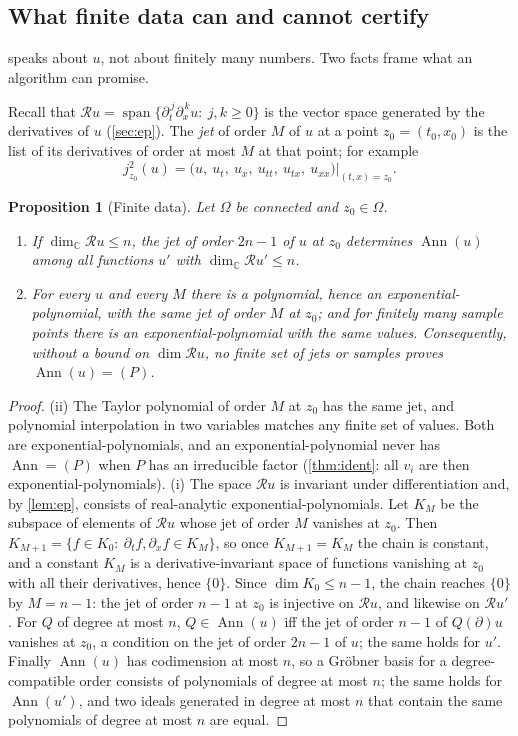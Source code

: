 \documentclass[11pt]{article}
\theoremstyle{plain}
\newtheorem{proposition}[theorem]{Proposition}
\theoremstyle{definition}
\theoremstyle{remark}
\newcommand{\C}{\mathbb{C}}
\newcommand{\ring}{\mathcal{R}}            %
\DeclareMathOperator{\Ann}{Ann}             %
\DeclareMathOperator{\spn}{span}
\begin{document}
\subsection{What finite data can and cannot certify}\label{sec:certify}
 speaks about $u$, not about finitely many numbers. Two facts frame what an algorithm
can promise.

Recall that $\ring u=\spn\{\partial_t^{\,j}\partial_x^{\,k}u:\ j,k\ge0\}$ is the vector space generated by the
derivatives of $u$ (\cref{sec:ep}). The \emph{jet} of order $M$ of $u$ at a point $z_0=(t_0,x_0)$ is the list of its
derivatives of order at most $M$ at that point; for example
\[
  j^2_{z_0}(u)=\big(u,\ u_t,\ u_x,\ u_{tt},\ u_{tx},\ u_{xx}\big)\big|_{(t,x)=z_0}.
\]

\begin{proposition}[Finite data]\label{prop:certify}
Let $\Omega$ be connected and $z_0\in\Omega$.
\begin{enumerate}[label=(\roman*)]
  \item If $\dim_\C\ring u\le n$, the jet of order $2n-1$ of $u$ at $z_0$ determines $\Ann(u)$ among all functions
  $u'$ with $\dim_\C\ring u'\le n$.
  \item For every $u$ and every $M$ there is a polynomial, hence an exponential-polynomial, with the same jet of
  order $M$ at $z_0$; and for finitely many sample points there is an exponential-polynomial with the same values.
  Consequently, without a bound on $\dim\ring u$, no finite set of jets or samples proves $\Ann(u)=(P)$.
\end{enumerate}
\end{proposition}

\begin{proof}
(ii) The Taylor polynomial of order $M$ at $z_0$ has the same jet, and polynomial interpolation in two variables
matches any finite set of values. Both are exponential-polynomials, and an exponential-polynomial never has
$\Ann=(P)$ when $P$ has an irreducible factor (\cref{thm:ident}: all $v_i$ are then exponential-polynomials).
(i) The space $\ring u$ is invariant under differentiation and, by \cref{lem:ep}, consists of real-analytic
exponential-polynomials. Let $K_M$ be the subspace of elements of $\ring u$ whose jet of order $M$ vanishes at $z_0$.
Then $K_{M+1}=\{f\in K_0:\ \partial_tf,\partial_xf\in K_M\}$, so once $K_{M+1}=K_M$ the chain is constant, and a
constant $K_M$ is a derivative-invariant space of functions vanishing at $z_0$ with all their derivatives, hence
$\{0\}$. Since $\dim K_0\le n-1$, the chain reaches $\{0\}$ by $M=n-1$: the jet of order $n-1$ at $z_0$ is injective
on $\ring u$, and likewise on $\ring u'$. For $Q$ of degree at most $n$, $Q\in\Ann(u)$ iff the jet of order
$n-1$ of $Q(\partial)u$ vanishes at $z_0$, a condition on the jet of order $2n-1$ of $u$; the same holds for $u'$.
Finally $\Ann(u)$ has codimension at most $n$, so a Gr\"obner basis for a degree-compatible order consists of
polynomials of degree at most $n$; the same holds for $\Ann(u')$, and two ideals generated in degree at most $n$
that contain the same polynomials of degree at most $n$ are equal.
\end{proof}
\end{document}
